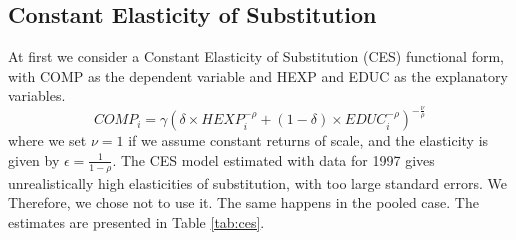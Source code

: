 \documentclass[12pt,a4paper]{article}\usepackage[]{graphicx}\usepackage[]{color}
\begin{document}
\subsection{Constant Elasticity of Substitution}
At first we consider a Constant Elasticity of Substitution (CES) functional form, with COMP as the dependent variable and HEXP and EDUC as the explanatory variables.
\begin{equation}
COMP_i = \gamma \left( \delta \times HEXP_i^{-\rho} + (1- \delta) \times EDUC_i^{-\rho} \right)^{-\frac{\nu}{\rho}}
\end{equation}
where we set $\nu = 1$ if we assume constant returns of scale, and the elasticity is given by $\epsilon = \frac{1}{1- \rho}$. The CES model estimated with data for 1997 gives unrealistically high elasticities of substitution, with too large standard errors. We Therefore, we chose not to use it. The same happens in the pooled case. The estimates are presented in Table \ref{tab:ces}.
\end{document}
